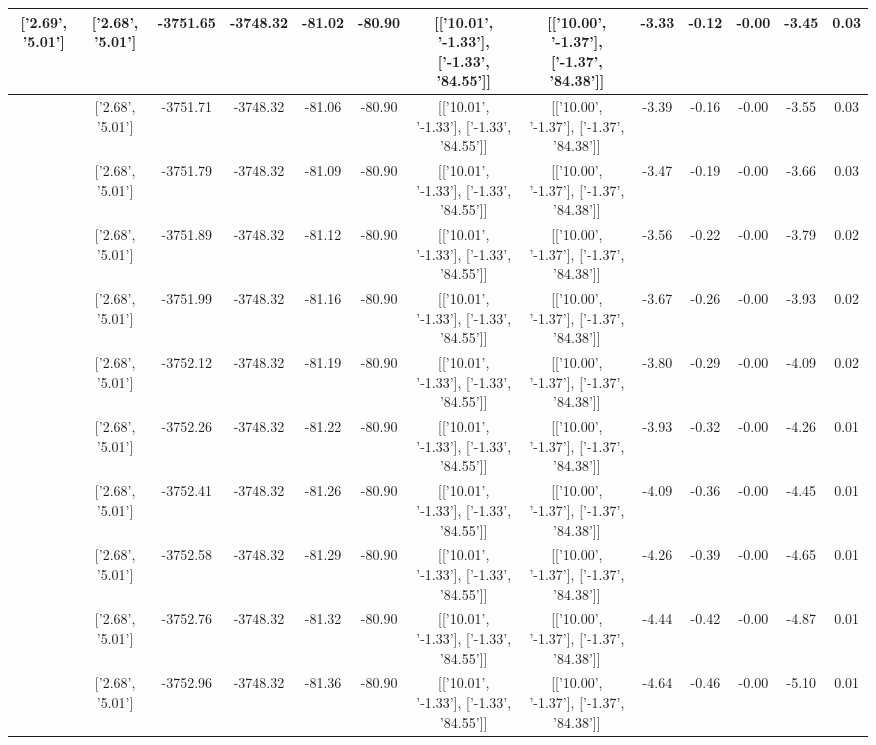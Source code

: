 \begin{table}[htbp]
\begin{adjustbox}{angle=90}
\begin{tabular}{|c|c|c|c|c|c|c|c|c|c|c|c|c|}
 ['2.69', '5.01'] & ['2.68', '5.01'] & -3751.65 & -3748.32 & -81.02 & -80.90 & [['10.01', '-1.33'], ['-1.33', '84.55']] & [['10.00', '-1.37'], ['-1.37', '84.38']] & -3.33 & -0.12 & -0.00 & -3.45 & 0.03\\ \hline
 ['2.69', '5.01'] & ['2.68', '5.01'] & -3751.71 & -3748.32 & -81.06 & -80.90 & [['10.01', '-1.33'], ['-1.33', '84.55']] & [['10.00', '-1.37'], ['-1.37', '84.38']] & -3.39 & -0.16 & -0.00 & -3.55 & 0.03\\ \hline
 ['2.69', '5.01'] & ['2.68', '5.01'] & -3751.79 & -3748.32 & -81.09 & -80.90 & [['10.01', '-1.33'], ['-1.33', '84.55']] & [['10.00', '-1.37'], ['-1.37', '84.38']] & -3.47 & -0.19 & -0.00 & -3.66 & 0.03\\ \hline
 ['2.69', '5.01'] & ['2.68', '5.01'] & -3751.89 & -3748.32 & -81.12 & -80.90 & [['10.01', '-1.33'], ['-1.33', '84.55']] & [['10.00', '-1.37'], ['-1.37', '84.38']] & -3.56 & -0.22 & -0.00 & -3.79 & 0.02\\ \hline
 ['2.69', '5.01'] & ['2.68', '5.01'] & -3751.99 & -3748.32 & -81.16 & -80.90 & [['10.01', '-1.33'], ['-1.33', '84.55']] & [['10.00', '-1.37'], ['-1.37', '84.38']] & -3.67 & -0.26 & -0.00 & -3.93 & 0.02\\ \hline
 ['2.70', '5.01'] & ['2.68', '5.01'] & -3752.12 & -3748.32 & -81.19 & -80.90 & [['10.01', '-1.33'], ['-1.33', '84.55']] & [['10.00', '-1.37'], ['-1.37', '84.38']] & -3.80 & -0.29 & -0.00 & -4.09 & 0.02\\ \hline
 ['2.70', '5.01'] & ['2.68', '5.01'] & -3752.26 & -3748.32 & -81.22 & -80.90 & [['10.01', '-1.33'], ['-1.33', '84.55']] & [['10.00', '-1.37'], ['-1.37', '84.38']] & -3.93 & -0.32 & -0.00 & -4.26 & 0.01\\ \hline
 ['2.70', '5.01'] & ['2.68', '5.01'] & -3752.41 & -3748.32 & -81.26 & -80.90 & [['10.01', '-1.33'], ['-1.33', '84.55']] & [['10.00', '-1.37'], ['-1.37', '84.38']] & -4.09 & -0.36 & -0.00 & -4.45 & 0.01\\ \hline
 ['2.70', '5.01'] & ['2.68', '5.01'] & -3752.58 & -3748.32 & -81.29 & -80.90 & [['10.01', '-1.33'], ['-1.33', '84.55']] & [['10.00', '-1.37'], ['-1.37', '84.38']] & -4.26 & -0.39 & -0.00 & -4.65 & 0.01\\ \hline
 ['2.70', '5.01'] & ['2.68', '5.01'] & -3752.76 & -3748.32 & -81.32 & -80.90 & [['10.01', '-1.33'], ['-1.33', '84.55']] & [['10.00', '-1.37'], ['-1.37', '84.38']] & -4.44 & -0.42 & -0.00 & -4.87 & 0.01\\ \hline
 ['2.70', '5.02'] & ['2.68', '5.01'] & -3752.96 & -3748.32 & -81.36 & -80.90 & [['10.01', '-1.33'], ['-1.33', '84.55']] & [['10.00', '-1.37'], ['-1.37', '84.38']] & -4.64 & -0.46 & -0.00 & -5.10 & 0.01\\ \hline

\end{tabular}
\end{adjustbox}
\end{table}
